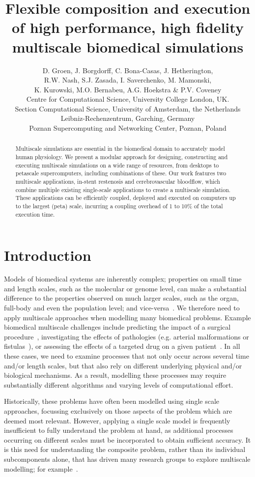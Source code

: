 \documentclass[a4,10pt]{article}
\title{Flexible composition and execution of high performance, high 
       fidelity multiscale biomedical simulations}
\author{D. Groen, J. Borgdorff, C. Bona-Casas, J. Hetherington,\\ 
R.W. Nash, S.J. Zasada, I. Saverchenko, M. Mamonski,\\
K. Kurowski, M.O. Bernabeu, A.G. Hoekstra \& P.V. Coveney\\
\small{ Centre for Computational Science, University College London, UK.}\\
\small{ Section Computational Science, University of Amsterdam, the Netherlands}\\
\small{ Leibniz-Rechenzentrum, Garching, Germany}\\
\small{ Poznan Supercomputing and Networking Center, Poznan, Poland}}
\date{}
\begin{document}
\maketitle

\begin{abstract} 
Multiscale simulations are essential in the biomedical domain
to accurately model human physiology. We present a modular
approach for designing, constructing and executing multiscale simulations on a
wide range of resources, from desktops to petascale supercomputers, including
combinations of these.  Our work features two multiscale applications, in-stent
restenosis and cerebrovascular bloodflow, which combine multiple existing
single-scale applications to create a multiscale simulation. These applications
can be efficiently coupled, deployed and executed on computers up to the largest
(peta) scale, incurring a coupling overhead of 1 to 10\% of the total
execution time.  
\end{abstract}

\section{Introduction}

Models of biomedical systems are inherently complex; properties on small time
and length scales, such as the molecular or genome level, can make a
substantial difference to the properties observed on much larger scales, such
as the organ, full-body and even the population level; and vice-versa~\cite{Sloot:2010,Noble:2009}. We
therefore need to apply multiscale approaches when modelling many biomedical
problems. Example biomedical multiscale challenges include predicting the
impact of a surgical procedure~\cite{Tahir:2011}, investigating the effects of pathologies (e.g.
arterial malformations or fistulas~\cite{Migliavacca:2005}), or assessing the effects of a
targeted drug on a given patient~\cite{ObiolPardo:2011}. In all these cases, we need to
examine processes that not only occur across several time and/or length scales, but
that also rely on different underlying physical and/or biological mechanisms. As a
result, modelling these processes may require substantially different algorithms 
and varying levels of computational effort. 

Historically, these problems have often been modelled using single scale
approaches, focussing exclusively on those aspects of the problem which are deemed most
relevant.  However, applying a single scale model is frequently insufficient 
to fully understand the problem at hand, as additional
processes occurring on different scales must be incorporated to obtain
sufficient accuracy. It is this need for understanding the composite
problem, rather than its individual subcomponents alone, that has driven many
research groups to explore multiscale
modelling; for example~\cite{Noble:2002,Finkelstein:2004,Hetherington:2007,Southern:2008}.
\end{document}

